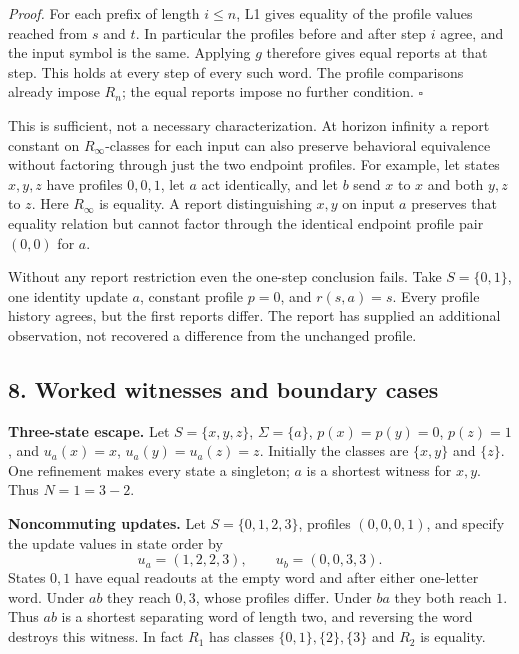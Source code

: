 \documentclass[
  11pt,
]{article}
\begin{document}
\emph{Proof.} For each prefix of length \(i\le n\), L1 gives equality of
the profile values reached from \(s\) and \(t\). In particular the
profiles before and after step \(i\) agree, and the input symbol is the
same. Applying \(g\) therefore gives equal reports at that step. This
holds at every step of every such word. The profile comparisons already
impose \(R_n\); the equal reports impose no further condition.
\(\square\)

This is sufficient, not a necessary characterization. At horizon
infinity a report constant on \(R_\infty\)-classes for each input can
also preserve behavioral equivalence without factoring through just the
two endpoint profiles. For example, let states \(x,y,z\) have profiles
\(0,0,1\), let \(a\) act identically, and let \(b\) send \(x\) to \(x\)
and both \(y,z\) to \(z\). Here \(R_\infty\) is equality. A report
distinguishing \(x,y\) on input \(a\) preserves that equality relation
but cannot factor through the identical endpoint profile pair \((0,0)\)
for \(a\).

Without any report restriction even the one-step conclusion fails. Take
\(S=\{0,1\}\), one identity update \(a\), constant profile \(p=0\), and
\(r(s,a)=s\). Every profile history agrees, but the first reports
differ. The report has supplied an additional observation, not recovered
a difference from the unchanged profile.

\subsection{8. Worked witnesses and boundary
cases}\label{worked-witnesses-and-boundary-cases}

\textbf{Three-state escape.} Let \(S=\{x,y,z\}\), \(\Sigma=\{a\}\),
\(p(x)=p(y)=0\), \(p(z)=1\), and \(u_a(x)=x\), \(u_a(y)=u_a(z)=z\).
Initially the classes are \(\{x,y\}\) and \(\{z\}\). One refinement
makes every state a singleton; \(a\) is a shortest witness for \(x,y\).
Thus \(N=1=3-2\).

\textbf{Noncommuting updates.} Let \(S=\{0,1,2,3\}\), profiles
\((0,0,0,1)\), and specify the update values in state order by \[
 u_a=(1,2,2,3),\qquad u_b=(0,0,3,3).
\] States \(0,1\) have equal readouts at the empty word and after either
one-letter word. Under \(ab\) they reach \(0,3\), whose profiles differ.
Under \(ba\) they both reach \(1\). Thus \(ab\) is a shortest separating
word of length two, and reversing the word destroys this witness. In
fact \(R_1\) has classes \(\{0,1\},\{2\},\{3\}\) and \(R_2\) is
equality.
\end{document}

